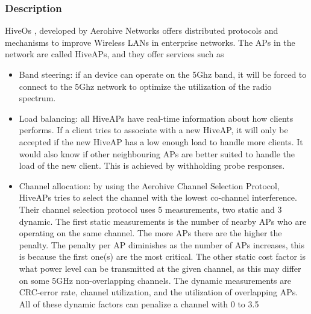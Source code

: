 \subsubsection{Description}
HiveOs \cite{Aerohive}, developed by Aerohive Networks offers distributed protocols and mechanisms to improve Wireless LANs in enterprise networks. The APs 
in the network are called HiveAPs, and they offer services such as
\begin{itemize}
	\item Band steering: if an device can operate on the 5Ghz band, it will be forced to connect to the 5Ghz network to optimize the utilization of the radio spectrum. 
	\item Load balancing: all HiveAPs have real-time information about how clients performs. If a client tries to associate with a new HiveAP, it will only be accepted
				if the new HiveAP has a low enough load to handle more clients. It would also know if other neighbouring APs are better suited to handle the load of the new client.
				This is achieved by withholding probe responses.

	\item Channel allocation: by using the Aerohive Channel Selection Protocol, HiveAPs tries to select the channel with the lowest co-channel interference. Their channel selection protocol uses 5 measurements, two static and 3 dynamic.
	The first static measurements is the number of nearby APs who are operating on the same channel. The more APs there are the higher the penalty. The penalty per AP diminishes as the number of APs increases, this
		is because the first one(s) are the most critical. The other static cost factor is what power level can be transmitted at the given channel, as this may differ on some 5GHz non-overlapping channels. The dynamic measurements are CRC-error rate, channel utilization,
	and the utilization of overlapping APs. All of these dynamic factors can penalize a channel with 0 to 3.5%

\end{itemize}

